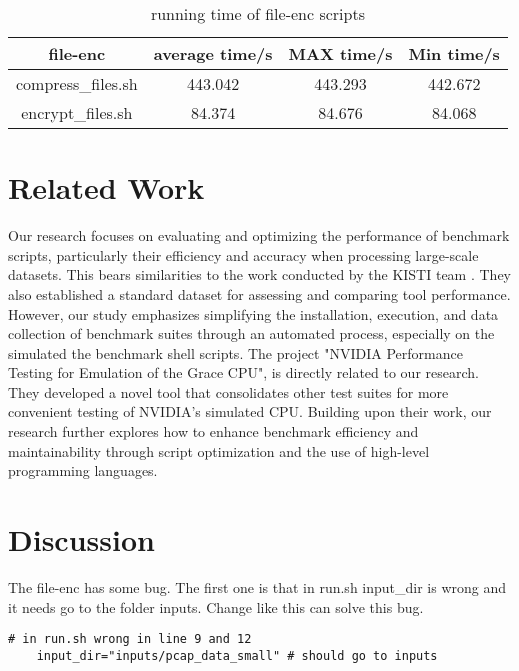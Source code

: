 \documentclass[sigplan, screen, 10pt]{acmart}
\begin{document}
\begin{table}[]
    \centering
    \begin{tabular}{c|c|c|c}
        \textbf{file-enc}& \textbf{average time/s} & \textbf{MAX time/s} & \textbf{Min time/s} \\
         \hline
         compress_files.sh & 443.042 & 443.293 & 442.672 \\
         encrypt_files.sh & 84.374 & 84.676 & 84.068 \\
         \hline
    \end{tabular}
    \caption{running time of file-enc scripts}
\end{table}

\section{Related Work}
\label{related}
Our research focuses on evaluating and optimizing the performance of benchmark scripts, particularly their efficiency and accuracy when processing large-scale datasets.\newline
This bears similarities to the work conducted by the KISTI team \cite{kim2015webshark}.   
They also established a standard dataset for assessing and comparing tool performance.
However, our study emphasizes simplifying the installation, execution, and data collection of benchmark suites through an automated process, especially on the simulated the benchmark shell scripts.\newline
The project "NVIDIA Performance Testing for Emulation of the Grace CPU"\cite{fan2021nvidia}, is directly related to our research.
They developed a novel tool that consolidates other test suites for more convenient testing of NVIDIA's simulated CPU. 
Building upon their work, our research further explores how to enhance benchmark efficiency and maintainability through script optimization and the use of high-level programming languages.\newline

\section{Discussion}
\label{dis}

The file-enc has some bug.
The first one is that in run.sh input\_dir is wrong and it needs go to the folder inputs.
Change like this can solve this bug.
\begin{verbatim}
# in run.sh wrong in line 9 and 12
    input_dir="inputs/pcap_data_small" # should go to inputs
\end{verbatim}
\end{document}
